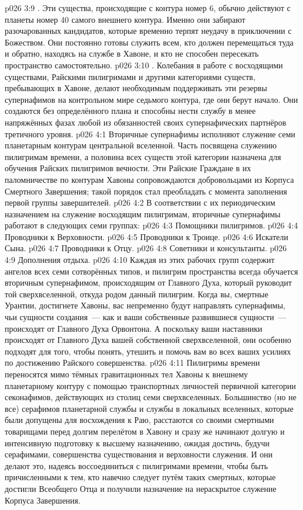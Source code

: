 \vs p026 3:9 . Эти существа, происходящие с контура номер 6, обычно действуют с планеты номер 40 самого внешнего контура. Именно они забирают разочарованных кандидатов, которые временно терпят неудачу в приключении с Божеством. Они постоянно готовы служить всем, кто должен перемещаться туда и обратно, находясь на службе в Хавоне, и кто не способен пересекать пространство самостоятельно.
\vs p026 3:10 . Колебания в работе с восходящими существами, Райскими пилигримами и другими категориями существ, пребывающих в Хавоне, делают необходимым поддерживать эти резервы супернафимов на контрольном мире седьмого контура, где они берут начало. Они создаются без определённого плана и способны нести службу в менее напряжённых фазах любой из обязанностей своих супернафических партнёров третичного уровня.
\vs p026 4:1 Вторичные супернафимы исполняют служение семи планетарным контурам центральной вселенной. Часть посвящена служению пилигримам времени, а половина всех существ этой категории назначена для обучения Райских пилигримов вечности. Эти Райские Граждане в их паломничестве по контурам Хавоны сопровождаются добровольцами из Корпуса Смертного Завершения; такой порядок стал преобладать с момента заполнения первой группы завершителей.
\vs p026 4:2 \pc В соответствии с их периодическим назначением на служение восходящим пилигримам, вторичные супернафимы работают в следующих семи группах:
\vs p026 4:3 Помощники пилигримов.
\vs p026 4:4 Проводники к Верховности.
\vs p026 4:5 Проводники к Троице.
\vs p026 4:6 Искатели Сына.
\vs p026 4:7 Проводники к Отцу.
\vs p026 4:8 Советники и консультанты.
\vs p026 4:9 Дополнения отдыха.
\vs p026 4:10 \pc Каждая из этих рабочих групп содержит ангелов всех семи сотворённых типов, и пилигрим пространства всегда обучается вторичным супернафимом, происходящим от Главного Духа, который руководит той сверхвселенной, откуда родом данный пилигрим. Когда вы, смертные Урантии, достигнете Хавоны, вас непременно будут направлять супернафимы, чьи сущности создания~--- как и ваши собственные развившиеся сущности~--- происходят от Главного Духа Орвонтона. А поскольку ваши наставники происходят от Главного Духа вашей собственной сверхвселенной, они особенно подходят для того, чтобы понять, утешить и помочь вам во всех ваших усилиях по достижению Райского совершенства.
\vs p026 4:11 Пилигримы времени переносятся мимо тёмных гравитационных тел Хавоны к внешнему планетарному контуру с помощью транспортных личностей первичной категории секонафимов, действующих из столиц семи сверхвселенных. Большинство (но не все) серафимов планетарной службы и службы в локальных вселенных, которые были допущены для восхождения к Раю, расстаются со своими смертными товарищами перед долгим перелётом в Хавону и сразу же начинают долгую и интенсивную подготовку к высшему назначению, ожидая достичь, будучи серафимами, совершенства существования и верховности служения. И они делают это, надеясь воссоединиться с пилигримами времени, чтобы быть причисленными к тем, кто навечно следует путём таких смертных, которые достигли Всеобщего Отца и получили назначение на нераскрытое служение Корпуса Завершения.
